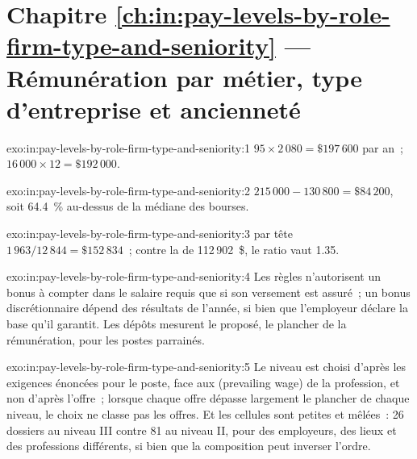 \section*{Chapitre \ref{ch:in:pay-levels-by-role-firm-type-and-seniority} --- Rémunération par métier, type d'entreprise et ancienneté}

\begin{solution}{exo:in:pay-levels-by-role-firm-type-and-seniority:1}
$95\times2\,080=\$197\,600$ par an~; $16\,000\times12=\$192\,000$.
\end{solution}

\begin{solution}{exo:in:pay-levels-by-role-firm-type-and-seniority:2}
$215\,000-130\,800=\$84\,200$, soit 64.4~\% au-dessus de la médiane des bourses.
\end{solution}

\begin{solution}{exo:in:pay-levels-by-role-firm-type-and-seniority:3}
 par tête $1\,963/12\,844=\$152\,834$~; contre la  de 112\,902~\$, le ratio vaut 1.35.
\end{solution}

\begin{solution}{exo:in:pay-levels-by-role-firm-type-and-seniority:4}
Les règles n'autorisent un bonus à compter dans le salaire requis que si son versement est assuré~; un bonus discrétionnaire dépend
des résultats de l'année, si bien que l'employeur déclare la base qu'il garantit. Les dépôts mesurent le  proposé, le plancher
de la rémunération, pour les postes parrainés.
\end{solution}

\begin{solution}{exo:in:pay-levels-by-role-firm-type-and-seniority:5}
Le niveau est choisi d'après les exigences énoncées pour le poste, face aux  (prevailing wage) de la profession, et non d'après l'offre~;
lorsque chaque offre dépasse largement le plancher de chaque niveau, le choix ne classe pas les offres. Et les cellules sont petites et
mêlées~: 26 dossiers au niveau III contre 81 au niveau II, pour des employeurs, des lieux et des professions différents, si bien que
la composition peut inverser l'ordre.
\end{solution}

